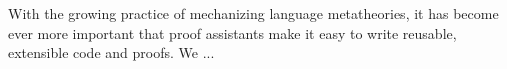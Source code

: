 
With the growing practice of mechanizing language metatheories,
it has become ever more important that proof assistants
make it easy to write reusable, extensible code and proofs.
We ...